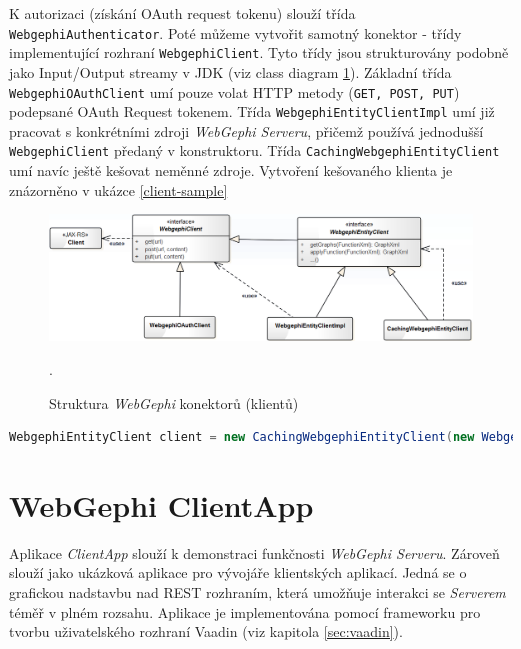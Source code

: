 \documentclass[thesis=M,czech]{FITthesis}[2014/05/6]
\begin{document}
K autorizaci (získání OAuth request tokenu) slouží třída \texttt{WebgephiAuthen\-ticator}. Poté můžeme vytvořit samotný konektor - třídy implementující 
rozhraní \texttt{WebgephiClient}. Tyto třídy jsou strukturovány podobně jako In\-put/Out\-put streamy v JDK (viz class diagram \ref{fig:webgephi-client-impl}). Základní třída \texttt{Webgephi\-OAuthClient} umí pouze
volat HTTP metody (\texttt{GET, POST, PUT}) podepsané OAuth Request tokenem. Třída \texttt{WebgephiEntityClientImpl} umí již pracovat s konkrétními zdroji \textit{WebGephi Serveru}, 
přičemž používá jednodušší \texttt{Webgephi\-Client} předaný v konstruktoru. Třída \texttt{Caching\-Webgephi\-Entity\-Client} umí navíc ještě kešovat neměnné zdroje. Vytvoření kešovaného klienta 
je znázorněno v ukázce \ref{client-sample} 

\begin{figure}\centering
 	\includegraphics[width=1\textwidth]{images/diagram/webgephi-client-impl}
 	\caption[Struktura \textit{WebGephi} konektorů (klientů)]{Struktura \textit{WebGephi} konektorů (klientů)}.\label{fig:webgephi-client-impl}
\end{figure}

\begin{lstlisting}[caption=Vytvoření \texttt{CachingWebgephiEntityClient}, label=client-sample, language=java]
WebgephiEntityClient client = new CachingWebgephiEntityClient(new WebgephiEntityClientImpl(new WebgephiOAuthClient("https://webgephi.local:8443/rest/v1", accessToken)));
\end{lstlisting} 

\section{WebGephi ClientApp}
Aplikace \textit{ClientApp} slouží k demonstraci funkčnosti \textit{WebGephi Serveru}. Zároveň slouží jako ukázková aplikace pro vývojáře klientských aplikací. Jedná se 
o grafickou nadstavbu nad REST rozhraním, která umožňuje interakci se \textit{Serverem} téměř v plném rozsahu. Aplikace je implementována pomocí frameworku 
pro tvorbu uživatelského rozhraní Vaadin (viz kapitola \ref{sec:vaadin}).
\end{document}
